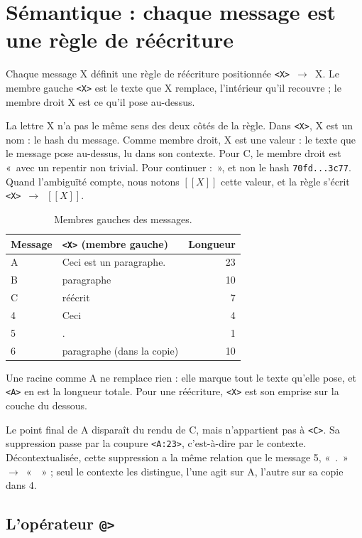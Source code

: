 \documentclass[11pt,a4paper]{article}
\newcommand{\cd}[1]{\texttt{#1}}
\newcommand{\regle}[2]{\cd{<#1>}~$\to$~#2}
\begin{document}
\section{Sémantique : chaque message est une règle de réécriture}

Chaque message X définit une règle de réécriture positionnée \regle{X}{X}. Le membre gauche \cd{<X>} est le texte que X remplace, l'intérieur qu'il recouvre ; le membre droit X est ce qu'il pose au-dessus.

La lettre X n'a pas le même sens des deux côtés de la règle. Dans \cd{<X>}, X est un nom : le hash du message. Comme membre droit, X est une valeur : le texte que le message pose au-dessus, lu dans son contexte. Pour C, le membre droit est «~avec un repentir non trivial. Pour continuer :~», et non le hash \cd{70fd...3c77}. Quand l'ambiguïté compte, nous notons $[\![X]\!]$ cette valeur, et la règle s'écrit \cd{<X>}~$\to$~$[\![X]\!]$.

\begin{table}[H]
\centering
\begin{tabular}{@{}llr@{}}
\toprule
Message & \cd{<X>} (membre gauche) & Longueur \\
\midrule
A & Ceci est un paragraphe. & 23 \\
B & paragraphe & 10 \\
C & réécrit & 7 \\
4 & Ceci & 4 \\
5 & . & 1 \\
6 & paragraphe (dans la copie) & 10 \\
\bottomrule
\end{tabular}
\caption{Membres gauches des messages.}
\end{table}

Une racine comme A ne remplace rien : elle marque tout le texte qu'elle pose, et \cd{<A>} en est la longueur totale. Pour une réécriture, \cd{<X>} est son emprise sur la couche du dessous.

Le point final de A disparaît du rendu de C, mais n'appartient pas à \cd{<C>}. Sa suppression passe par la coupure \cd{<A:23>}, c'est-à-dire par le contexte. Décontextualisée, cette suppression a la même relation que le message 5, «~.~»~$\to$~«~~» ; seul le contexte les distingue, l'une agit sur A, l'autre sur sa copie dans 4.

\subsection{L'opérateur \texttt{@>}}
\end{document}
